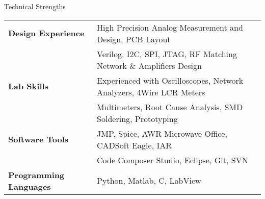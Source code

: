 \documentclass{resume} %
\begin{document}

\begin{rSection}{Technical Strengths}

\begin{tabular}{ @{} >{\bfseries}l @{\hspace{6ex}} l }
Design Experience & High Precision Analog Measurement and Design, PCB Layout \\
& Verilog, I2C, SPI, JTAG, RF Matching Network \& Amplifiers Design\smallskip \\

Lab Skills & Experienced with Oscilloscopes, Network Analyzers, 4Wire LCR Meters\\
& Multimeters, Root Cause Analysis, SMD Soldering, Prototyping \smallskip \\

Software Tools & JMP, Spice, AWR Microwave Office, CADSoft Eagle, IAR\\ 
 & Code Composer Studio, Eclipse, Git, SVN \smallskip \\

Programming Languages & Python, Matlab, C, LabView \smallskip \\ 

\end{tabular}

\end{rSection}
\smallskip
\end{document}
